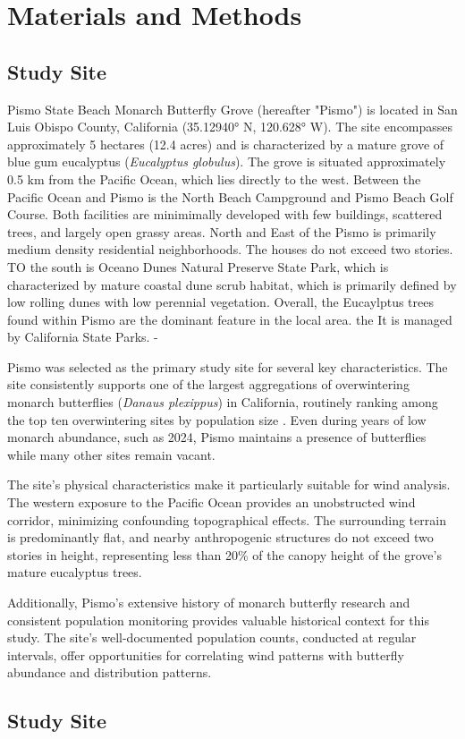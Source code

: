 \section{Materials and Methods}
\subsection{Study Site}
Pismo State Beach Monarch Butterfly Grove (hereafter "Pismo") is located in San Luis Obispo County, California (35.12940° N, 120.628° W). The site encompasses approximately 5 hectares (12.4 acres) and is characterized by a mature grove of blue gum eucalyptus (\textit{Eucalyptus globulus}). The grove is situated approximately 0.5 km from the Pacific Ocean, which lies directly to the west. Between the Pacific Ocean and Pismo is the North Beach Campground and Pismo Beach Golf Course. Both facilities are minimimally developed with few buildings, scattered trees, and largely open grassy areas. North and East of the Pismo is primarily medium density residential neighborhoods. The houses do not exceed two stories. TO the south is Oceano Dunes Natural Preserve State Park, which is characterized by mature coastal dune scrub habitat, which is primarily defined by low rolling dunes with low perennial vegetation. Overall, the Eucaylptus trees found within Pismo are the dominant feature in the local area. the  It is managed by California State Parks. 
-

Pismo was selected as the primary study site for several key characteristics. The site consistently supports one of the largest aggregations of overwintering monarch butterflies (\textit{Danaus plexippus}) in California, routinely ranking among the top ten overwintering sites by population size \autocite{westernmonarchcount2023}. Even during years of low monarch abundance, such as 2024, Pismo maintains a presence of butterflies while many other sites remain vacant.

The site's physical characteristics make it particularly suitable for wind analysis. The western exposure to the Pacific Ocean provides an unobstructed wind corridor, minimizing confounding topographical effects. The surrounding terrain is predominantly flat, and nearby anthropogenic structures do not exceed two stories in height, representing less than 20\% of the canopy height of the grove's mature eucalyptus trees.

Additionally, Pismo's extensive history of monarch butterfly research and consistent population monitoring provides valuable historical context for this study. The site's well-documented population counts, conducted at regular intervals, offer opportunities for correlating wind patterns with butterfly abundance and distribution patterns.

\subsection{Study Site}
